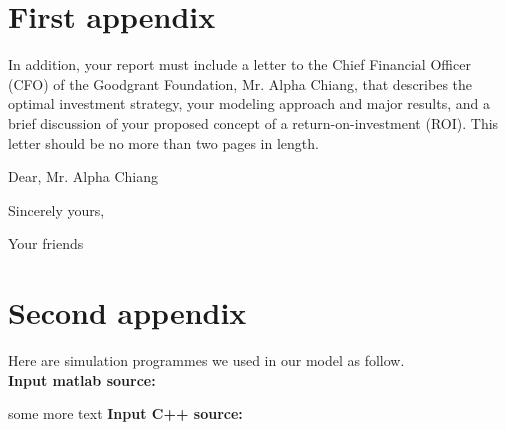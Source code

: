 \documentclass{mcmthesis}
\begin{document}
\begin{appendices}

\section{First appendix}

In addition, your report must include a letter to the Chief Financial Officer (CFO) of the Goodgrant Foundation, Mr. Alpha Chiang, that describes the optimal investment strategy, your modeling approach and major results, and a brief discussion of your proposed concept of a return-on-investment (ROI). This letter should be no more than two pages in length.

\begin{letter}{Dear, Mr. Alpha Chiang}

\lipsum[1-2]

\vspace{\parskip}

Sincerely yours,

Your friends

\end{letter}


\section{Second appendix}
Here are simulation programmes we used in our model as follow.\\

\textbf{\textcolor[rgb]{0.98,0.00,0.00}{Input matlab source:}}


some more text \textcolor[rgb]{0.98,0.00,0.00}{\textbf{Input C++ source:}}


\end{appendices}
\end{document}
